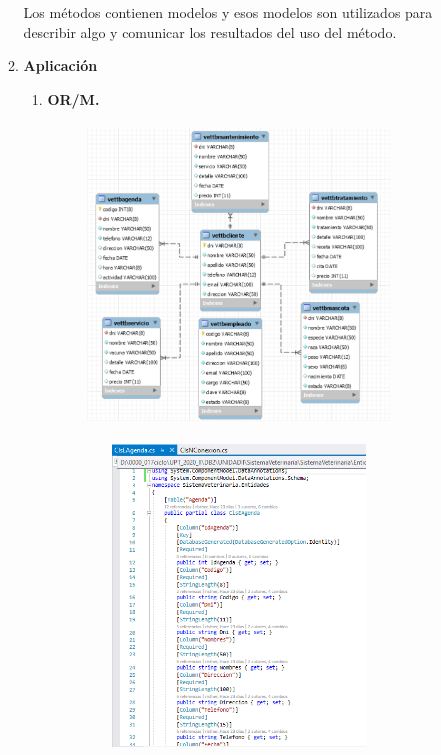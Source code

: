 \documentclass[12pt,a4paper,oneside]{book}
\begin{document}
\begin{enumerate}
\begin{enumerate}
						Los métodos contienen modelos y esos modelos son utilizados para describir algo y comunicar los resultados del uso del método. \\
		\newpage
				\item \textbf{Aplicaci\'on}  \\
					
					\begin{enumerate}
						\item \textbf{OR/M.}
						
							\begin{figure}[htb]
									\centering \includegraphics[width=8cm, height=8cm]{img/OR/mapa.png}
							\end{figure}
							
							\begin{figure}[htb]
									\centering \includegraphics[width=8cm, height=8cm]{img/OR/primera.png}
							\end{figure}
							

\end{enumerate}
\end{enumerate}
\end{enumerate}
\end{document}

